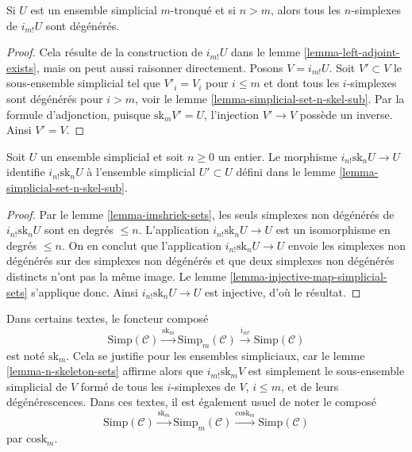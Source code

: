 \begin{lemma}
\label{lemma-imshriek-sets}
Si $U$ est un ensemble simplicial $m$-tronqué et si $n > m$, alors tous
les $n$-simplexes de $i_{m!}U$ sont dégénérés.
\end{lemma}

\begin{proof}
Cela résulte de la construction de $i_{m!}U$ dans le lemme
\ref{lemma-left-adjoint-exists}, mais on peut aussi raisonner directement.
Posons $V = i_{m!}U$. Soit $V' \subset V$ le sous-ensemble simplicial tel
que $V'_i = V_i$ pour $i \leq m$ et dont tous les $i$-simplexes sont
dégénérés pour $i > m$, voir le lemme
\ref{lemma-simplicial-set-n-skel-sub}. Par la formule d'adjonction, puisque
$\text{sk}_m V' = U$, l'injection $V' \to V$ possède un inverse. Ainsi
$V' = V$.
\end{proof}

\begin{lemma}
\label{lemma-n-skeleton-sets}
Soit $U$ un ensemble simplicial et soit $n \geq 0$ un entier. Le
morphisme $i_{n!} \text{sk}_n U \to U$ identifie
$i_{n!} \text{sk}_n U$ à l'ensemble simplicial $U' \subset U$ défini
dans le lemme \ref{lemma-simplicial-set-n-skel-sub}.
\end{lemma}

\begin{proof}
Par le lemme \ref{lemma-imshriek-sets}, les seuls simplexes non dégénérés
de $i_{n!} \text{sk}_n U$ sont en degrés $\leq n$. L'application
$i_{n!} \text{sk}_n U \to U$ est un isomorphisme en degrés $\leq n$.
On en conclut que l'application $i_{n!} \text{sk}_n U \to U$ envoie les
simplexes non dégénérés sur des simplexes non dégénérés et que deux
simplexes non dégénérés distincts n'ont pas la même image. Le lemme
\ref{lemma-injective-map-simplicial-sets} s'applique donc. Ainsi
$i_{n!} \text{sk}_n U \to U$ est injective, d'où le résultat.
\end{proof}

\begin{remark}
\label{remark-sk-literature}
Dans certains textes, le foncteur composé
$$
\text{Simp}(\mathcal{C})
\xrightarrow{\text{sk}_m}
\text{Simp}_m(\mathcal{C})
\xrightarrow{i_{m!}}
\text{Simp}(\mathcal{C})
$$
est noté $\text{sk}_m$. Cela se justifie pour les ensembles simpliciaux,
car le lemme \ref{lemma-n-skeleton-sets} affirme alors que
$i_{m!} \text{sk}_m V$ est simplement le sous-ensemble simplicial de
$V$ formé de tous les $i$-simplexes de $V$, $i \leq m$, et de leurs
dégénérescences. Dans ces textes, il est également usuel de noter le composé
$$
\text{Simp}(\mathcal{C})
\xrightarrow{\text{sk}_m}
\text{Simp}_m(\mathcal{C})
\xrightarrow{\text{cosk}_m}
\text{Simp}(\mathcal{C})
$$
par $\text{cosk}_m$.
\end{remark}

